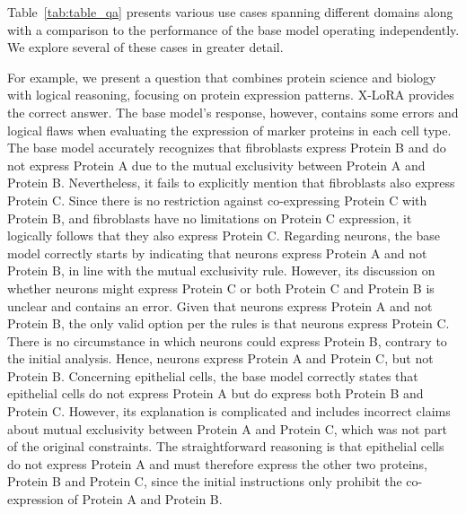 Table~\ref{tab:table_qa} presents various use cases spanning different domains along with a comparison to the performance of the base model operating independently. We explore several of these cases in greater detail.

For example, we present a question that combines protein science and biology with logical reasoning, focusing on protein expression patterns. X-LoRA provides the correct answer. The base model's response, however, contains some errors and logical flaws when evaluating the expression of marker proteins in each cell type. The base model accurately recognizes that fibroblasts express Protein B and do not express Protein A due to the mutual exclusivity between Protein A and Protein B. Nevertheless, it fails to explicitly mention that fibroblasts also express Protein C. Since there is no restriction against co-expressing Protein C with Protein B, and fibroblasts have no limitations on Protein C expression, it logically follows that they also express Protein C. Regarding neurons, the base model correctly starts by indicating that neurons express Protein A and not Protein B, in line with the mutual exclusivity rule. However, its discussion on whether neurons might express Protein C or both Protein C and Protein B is unclear and contains an error. Given that neurons express Protein A and not Protein B, the only valid option per the rules is that neurons express Protein C. There is no circumstance in which neurons could express Protein B, contrary to the initial analysis. Hence, neurons express Protein A and Protein C, but not Protein B. Concerning epithelial cells, the base model correctly states that epithelial cells do not express Protein A but do express both Protein B and Protein C. However, its explanation is complicated and includes incorrect claims about mutual exclusivity between Protein A and Protein C, which was not part of the original constraints. The straightforward reasoning is that epithelial cells do not express Protein A and must therefore express the other two proteins, Protein B and Protein C, since the initial instructions only prohibit the co-expression of Protein A and Protein B.

